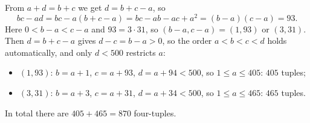 From $a+d=b+c$ we get $d=b+c-a$, so
\[bc-ad=bc-a(b+c-a)=bc-ab-ac+a^2=(b-a)(c-a)=93.\]
Here $0<b-a<c-a$ and $93=3\cdot31$, so $(b-a,c-a)=(1,93)$ or $(3,31)$. Then $d=b+c-a$ gives $d-c=b-a>0$, so the order $a<b<c<d$ holds automatically, and only $d<500$ restricts $a$:
\begin{itemize}
\item $(1,93)$: $b=a+1$, $c=a+93$, $d=a+94<500$, so $1\le a\le405$: $405$ tuples;
\item $(3,31)$: $b=a+3$, $c=a+31$, $d=a+34<500$, so $1\le a\le465$: $465$ tuples.
\end{itemize}
In total there are $405+465=\boxed{870}$ four-tuples.
